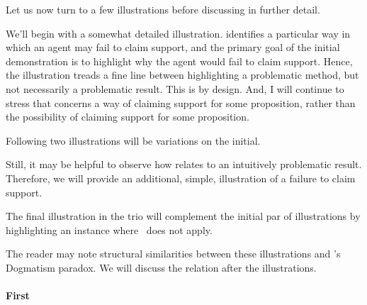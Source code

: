 \begin{note}
  Let us now turn to a few illustrations before discussing \nI{} in further detail.

  We'll begin with a somewhat detailed illustration.
  \nI{} identifies a particular way in which an agent may fail to claim support, and the primary goal of the initial demonstration is to highlight why the agent would fail to claim support.
  Hence, the illustration treads a fine line between highlighting a problematic method, but not necessarily a problematic result.
  This is by design.
  And, I will continue to stress that \nI{} concerns a way of claiming support for some proposition, rather than the possibility of claiming support for some proposition.

  Following two illustrations will be variations on the initial.

  Still, it may be helpful to observe how \nI{} relates to an intuitively problematic result.
  Therefore, we will provide an additional, simple, illustration of a failure to claim support.

  The final illustration in the trio will complement the initial par of illustrations by highlighting an instance where~\nI{} does not apply.

  The reader may note structural similarities between these illustrations and \citeauthor{Kripke:2011wv}'s Dogmatism paradox.
  We will discuss the relation after the illustrations.
\end{note}

\paragraph{First}

